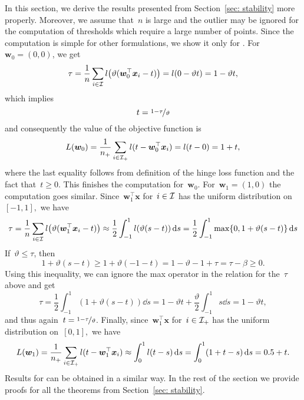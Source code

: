 In this section, we derive the results presented from Section~\ref{sec: stability} more properly. 
\degeneratebehavior*
\noindent Moreover, we assume that~$n$ is large and the outlier may be ignored for the computation of thresholds which require a large number of points. Since the computation is simple for other formulations, we show it only for \PatMat. For~$\bm{w}_0 = (0,0)$, we get
\begin{equation*}
  \tau
  = \frac{1}{n}\sum_{i \in \I} l\Brac{\vartheta(\bm{w}_0^\top \bm{x}_i - t)}
  = l(0 - \vartheta t) = 1 - \vartheta t,
\end{equation*}
which implies
\begin{equation*}\label{eq: PatMat threshold 0}
  t = \nicefrac{1-\tau}{\vartheta}
\end{equation*}
and consequently the value of the objective function is
\begin{equation}\label{eq: PatMat objective 0}
  L(\bm{w}_0)
    = \frac{1}{n_{+}} \sum_{i \in \mathcal{I}_{+}} l(t - \bm{w}_0^\top \bm{x}_i)
    = l(t - 0)
    = 1 + t,
\end{equation}
where the last equality follows from definition of the hinge loss function and the fact that~$t \geq 0.$ This finishes the computation for~$\bm{w}_0$. For~$\bm{w}_1 = (1,0)$ the computation goes similar. Since~$\bm{w}_1^\top \bm{x}$  for~$i \in \mathcal{I}$ has the uniform distribution on~$[-1,1],$ we have
\begin{equation*}
  \tau
    = \frac{1}{n} \sum_{i \in \I} l\Brac{\vartheta (\bm{w}_1^\top \bm{x}_i - t)}
    \approx \frac{1}{2}\int_{-1}^{1} l\Brac{\vartheta(s-t)} \dd{s}
    = \frac{1}{2} \int_{-1}^{1} \max\{0, 1 + \vartheta(s - t)\}\dd{s}
\end{equation*}
If~$\vartheta \leq \tau$, then
\begin{equation*}
  1 + \vartheta(s - t)
    \geq 1 + \vartheta(-1 - t)
    = 1 - \vartheta - 1 + \tau
    = \tau - \beta
    \geq 0.
\end{equation*}
Using this inequality, we can ignore the max operator in the relation for the~$\tau$ above and get
\begin{equation}\label{eq:example1}
  \tau
    =\frac{1}{2} \int_{-1}^{1} (1+\vartheta(s - t))\dd{s}
    = 1 - \vartheta t + \frac{\vartheta}{2}\int_{-1}^{1}s\dd{s}
    = 1 - \vartheta t,
\end{equation}
and thus again~$t = \nicefrac{1-\tau}{\vartheta}$. Finally, since~$\bm{w}_1^\top \bm{x}$  for~$i \in \mathcal{I}_{+}$ has the uniform distribution on~$[0,1],$ we have
\begin{equation*}
  L(\bm{w}_1)
    = \frac{1}{n_{+}} \sum_{i \in \mathcal{I}_{+}} l(t - \bm{w}_1^\top \bm{x}_i)
    \approx \int_{0}^{1} l(t-s)\mathop{}\!\mathrm{d}s
    = \int_{0}^{1} (1 + t - s)\mathop{}\!\mathrm{d}s
    = 0.5 + t.
\end{equation*}
Results for \PatMatNP can be obtained in a similar way. In the rest of the section we provide proofs for all the theorems from Section~\ref{sec: stability}.

